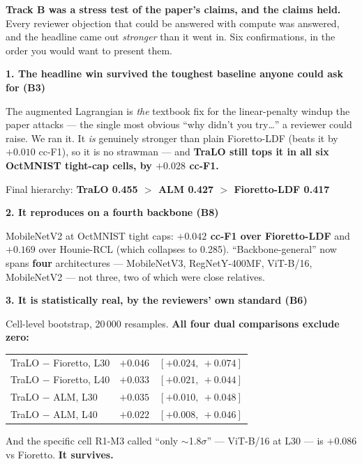 \documentclass[11pt,a4paper]{article}
\newenvironment{callout}[1]
  {\par\medskip\noindent\begin{lrbox}{\calloutbox}%
   \begin{minipage}{\dimexpr\linewidth-20pt\relax}%
   \textbf{#1}\par\smallskip}
  {\end{minipage}\end{lrbox}%
   \setlength{\fboxsep}{10pt}%
   \colorbox{boxgrey}{\usebox{\calloutbox}}\par\medskip}
\begin{document}
\textbf{Track B was a stress test of the paper's claims, and the claims held.} Every reviewer
objection that could be answered with compute was answered, and the headline came out
\emph{stronger} than it went in. Six confirmations, in the order you would want to present them.

\begin{callout}{1. The headline win survived the toughest baseline anyone could ask for (B3)}
The augmented Lagrangian is \emph{the} textbook fix for the linear-penalty windup the paper attacks
--- the single most obvious ``why didn't you try\dots'' a reviewer could raise. We ran it. It \emph{is}
genuinely stronger than plain Fioretto-LDF (beats it by $+0.010$ cc-F1), so it is no strawman ---
and \textbf{TraLO still tops it in all six OctMNIST tight-cap cells, by $+0.028$ cc-F1.}

\smallskip
\centerline{Final hierarchy: \textbf{TraLO 0.455 $>$ ALM 0.427 $>$ Fioretto-LDF 0.417}}
\end{callout}

\begin{callout}{2. It reproduces on a fourth backbone (B8)}
MobileNetV2 at OctMNIST tight caps: \textbf{$+0.042$ cc-F1 over Fioretto-LDF} and $+0.169$ over
Hounie-RCL (which collapses to 0.285). ``Backbone-general'' now spans \textbf{four} architectures
--- MobileNetV3, RegNetY-400MF, ViT-B/16, MobileNetV2 --- not three, two of which were close
relatives.
\end{callout}

\begin{callout}{3. It is statistically real, by the reviewers' own standard (B6)}
Cell-level bootstrap, 20\,000 resamples. \textbf{All four dual comparisons exclude zero:}

\smallskip
\begin{tabular}{@{}l r l@{}}
TraLO $-$ Fioretto, L30 & $+0.046$ & $[+0.024,\ +0.074]$ \\
TraLO $-$ Fioretto, L40 & $+0.033$ & $[+0.021,\ +0.044]$ \\
TraLO $-$ ALM, L30      & $+0.035$ & $[+0.010,\ +0.048]$ \\
TraLO $-$ ALM, L40      & $+0.022$ & $[+0.008,\ +0.046]$ \\
\end{tabular}
\smallskip

And the specific cell R1-M3 called ``only $\sim$1.8$\sigma$'' --- ViT-B/16 at L30 --- is
$\mathbf{+0.086}$ vs Fioretto. \textbf{It survives.}
\end{callout}
\end{document}
